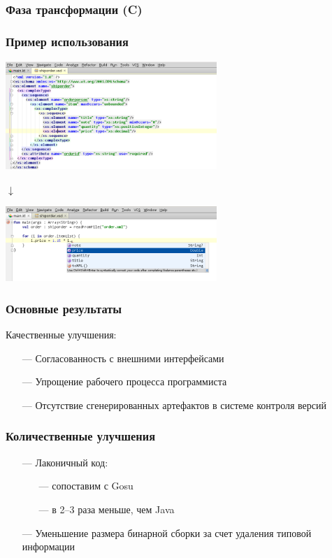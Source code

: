 \documentclass[12pt]{beamer}
\begin{document}
\begin{frame}\frametitle{Фаза трансформации (C)}
\end{frame}

\begin{frame}\frametitle{Пример использования}
\begin{center}
    \includegraphics[height=4.132cm,width=8cm]{shiporder}

    {$\mathbf\downarrow$} %

    \includegraphics[height=2.829cm,width=8cm]{completion}
\end{center}
\end{frame}


\begin{frame}\frametitle{Основные результаты}
    Качественные улучшения:
    \begin{itemize}
        \item[---] Согласованность с внешними интерфейсами
        \item[---] Упрощение рабочего процесса программиста
        \item[---] Отсутствие сгенерированных артефактов в системе контроля версий
    \end{itemize}
\end{frame}

\begin{frame}\frametitle{Количественные улучшения}
    \begin{itemize}
        \item[---] Лаконичный код:
            \begin{itemize}
                \item[---] сопоставим с Gosu
                \item[---] в 2--3 раза меньше, чем Java
            \end{itemize}
        \item[---] Уменьшение размера бинарной сборки за счет удаления типовой информации
    \end{itemize}
\end{frame}
\end{document}
